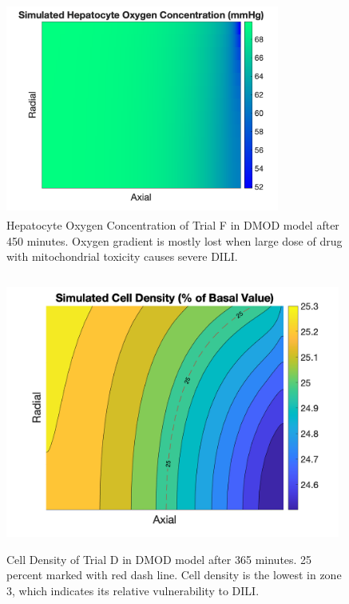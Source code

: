 \documentclass[12pt]{article}
\begin{document}
\begin{figure}[h!]
\centering
\includegraphics[width = 9cm, height =7cm]{loss.png}
    \caption{Hepatocyte Oxygen Concentration of Trial F in DMOD model after 450 minutes. Oxygen gradient is mostly lost when large dose of drug with mitochondrial toxicity causes severe DILI.}
\label{fig:loss}
\end{figure}
\begin{figure}[h!]
\centering
\includegraphics[width = 11cm, height =9cm]{gradient.png}
    \caption{Cell Density of Trial D in DMOD model after 365 minutes. 25 percent marked with red dash line. Cell density is the lowest in zone 3, which indicates its relative vulnerability to DILI.}
    \label{fig:gradient}
\end{figure}
\end{document}
